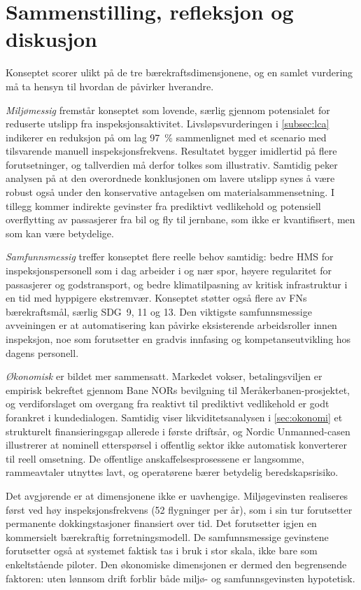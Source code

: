 \section{Sammenstilling, refleksjon og diskusjon} %

Konseptet scorer ulikt på de tre bærekraftsdimensjonene, og en samlet vurdering må ta hensyn til hvordan de påvirker hverandre.

\textit{Miljømessig} fremstår konseptet som lovende, særlig gjennom potensialet for reduserte utslipp fra inspeksjonsaktivitet. Livsløpsvurderingen i \cref{subsec:lca} indikerer en reduksjon på om lag 97~\% sammenlignet med et scenario med tilsvarende manuell inspeksjonsfrekvens. Resultatet bygger imidlertid på flere forutsetninger, og tallverdien må derfor tolkes som illustrativ. Samtidig peker analysen på at den overordnede konklusjonen om lavere utslipp synes å være robust også under den konservative antagelsen om materialsammensetning. I tillegg kommer indirekte gevinster fra prediktivt vedlikehold og potensiell overflytting av passasjerer fra bil og fly til jernbane, som ikke er kvantifisert, men som kan være betydelige.

\textit{Samfunnsmessig} treffer konseptet flere reelle behov samtidig: bedre HMS for inspeksjonspersonell som i dag arbeider i og nær spor, høyere regularitet for passasjerer og godstransport, og bedre klimatilpasning av kritisk infrastruktur i en tid med hyppigere ekstremvær. Konseptet støtter også flere av FNs bærekraftsmål, særlig SDG~9, 11 og 13. Den viktigste samfunnsmessige avveiningen er at automatisering kan påvirke eksisterende arbeidsroller innen inspeksjon, noe som forutsetter en gradvis innfasing og kompetanseutvikling hos dagens personell.

\textit{Økonomisk} er bildet mer sammensatt. Markedet vokser, betalingsviljen er empirisk bekreftet gjennom Bane NORs bevilgning til Meråkerbanen-prosjektet, og verdiforslaget om overgang fra reaktivt til prediktivt vedlikehold er godt forankret i kundedialogen. Samtidig viser likviditetsanalysen i \cref{sec:okonomi} et strukturelt finansieringsgap allerede i første driftsår, og Nordic Unmanned-casen illustrerer at nominell etterspørsel i offentlig sektor ikke automatisk konverterer til reell omsetning. De offentlige anskaffelsesprosessene er langsomme, rammeavtaler utnyttes lavt, og operatørene bærer betydelig beredskapsrisiko.

Det avgjørende er at dimensjonene ikke er uavhengige. Miljøgevinsten realiseres først ved høy inspeksjonsfrekvens (52 flygninger per år), som i sin tur forutsetter permanente dokkingstasjoner finansiert over tid. Det forutsetter igjen en kommersielt bærekraftig forretningsmodell. De samfunnsmessige gevinstene forutsetter også at systemet faktisk tas i bruk i stor skala, ikke bare som enkeltstående piloter. Den økonomiske dimensjonen er dermed den begrensende faktoren: uten lønnsom drift forblir både miljø- og samfunnsgevinsten hypotetisk.

